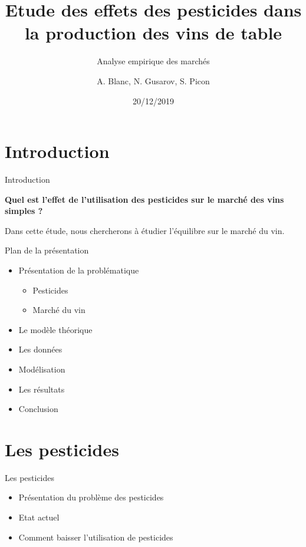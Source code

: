 \documentclass[11pt,ignorenonframetext,]{beamer}
\title{Etude des effets des pesticides dans la production des vins de table}
\subtitle{Analyse empirique des marchés}
\author{A. Blanc, N. Gusarov, S. Picon}
\institute{Université Grenoble Alpes}
\date{20/12/2019}
\providecommand{\tightlist}{%
  \setlength{\itemsep}{0pt}\setlength{\parskip}{0pt}}
\begin{document}
\frame{\titlepage}

\hypertarget{introduction}{%
\section{Introduction}\label{introduction}}

\begin{frame}{Introduction}
\protect\hypertarget{introduction-1}{}

\center

\textbf{Quel est l'effet de l'utilisation des pesticides sur le marché des vins simples ?}

Dans cette étude, nous chercherons à étudier l'équilibre sur le marché
du vin.

\end{frame}

\begin{frame}{Plan de la présentation}
\protect\hypertarget{plan-de-la-presentation}{}

\begin{itemize}
\tightlist
\item
  Présentation de la problématique

  \begin{itemize}
  \tightlist
  \item
    Pesticides
  \item
    Marché du vin
  \end{itemize}
\item
  Le modèle théorique
\item
  Les données
\item
  Modélisation
\item
  Les résultats
\item
  Conclusion
\end{itemize}

\end{frame}

\hypertarget{les-pesticides}{%
\section{Les pesticides}\label{les-pesticides}}

\begin{frame}{Les pesticides}
\protect\hypertarget{les-pesticides-1}{}

\begin{itemize}
\tightlist
\item
  Présentation du problème des pesticides
\item
  Etat actuel
\item
  Comment baisser l'utilisation de pesticides
\end{itemize}

\end{frame}
\end{document}
